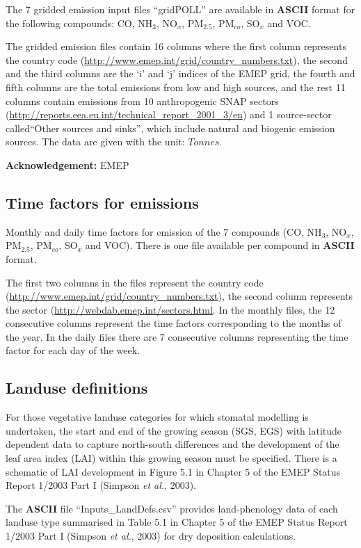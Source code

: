 The 7 gridded emission input files ``gridPOLL'' are available in 
{\bf ASCII} format for the following compounds: CO, NH$_{3}$,
NO$_{x}$, PM$_{2.5}$, PM$_{co}$, SO$_{x}$ and VOC.

The gridded emission files contain 16 columns where the first column 
represents the country code
(\url{http://www.emep.int/grid/country_numbers.txt}), 
the second and the third columns are the `i' and `j' indices of the
EMEP grid, the fourth and fifth columns are the total emissions from
low and high sources, and the rest 11 columns contain emissions from 
10 anthropogenic SNAP sectors 
(\url{http://reports.eea.eu.int/technical_report_2001_3/en}) and 1 
source-sector called``Other sources and sinks'', which include natural and
biogenic emission sources. The data are given with the unit: $Tonnes$.

{\bf Acknowledgement:} EMEP

\subsection{Time factors for emissions}

Monthly and daily time factors for emission of the 7 compounds 
(CO, NH$_{3}$, NO$_{x}$, PM$_{2.5}$, PM$_{co}$, SO$_{x}$ and VOC). 
There is one file available per compound in {\bf ASCII} format. 

The first two columns in the files represent the country code
(\url{http://www.emep.int/grid/country_numbers.txt}), the second column 
represents the sector (\url{http://webdab.emep.int/sectors.html}. In the monthly files, 
the 12 consecutive columns represent the time factors corresponding to 
the months of the year. In the daily files there are 7 consecutive columns representing 
the time factor for each day of the week. 

\subsection{Landuse definitions}
For those vegetative landuse categories for which stomatal modelling is
undertaken, the start and end of the growing season (SGS, EGS) with
latitude dependent data to capture north-south differences and the
development of the leaf area index (LAI) within this growing season
must be specified. There is a schematic of LAI development in Figure
5.1 in Chapter 5 of the EMEP Status Report 1/2003 Part I (Simpson {\sl et al.}, 2003).

The {\bf ASCII} file ``Inputs\_LandDefs.csv'' provides land-phenology data
of each landuse type summarised in Table 5.1 in Chapter 5 of the EMEP 
Status Report 1/2003 Part I (Simpson {\sl et al.}, 2003) for dry deposition 
calculations.

